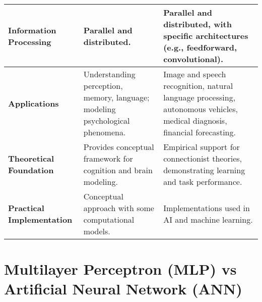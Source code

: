 \begin{longtable}{|>{\raggedright\arraybackslash}p{3cm}|>{\raggedright\arraybackslash}p{6cm}|>{\raggedright\arraybackslash}p{6cm}|}
    \textbf{Information Processing} & Parallel and distributed. & Parallel and distributed, with specific architectures (e.g., feedforward, convolutional). \\
    \hline
    
    \textbf{Applications} & Understanding perception, memory, language; modeling psychological phenomena. & Image and speech recognition, natural language processing, autonomous vehicles, medical diagnosis, financial forecasting. \\
    \hline
    
    \textbf{Theoretical Foundation} & Provides conceptual framework for cognition and brain modeling. & Empirical support for connectionist theories, demonstrating learning and task performance. \\
    \hline

    \textbf{Practical Implementation} & Conceptual approach with some computational models. & Implementations used in AI and machine learning. \\
    \hline
\end{longtable}


\section{Multilayer Perceptron (MLP) vs Artificial Neural Network (ANN)}\label{mlp vs ann}


